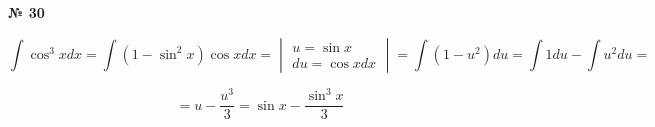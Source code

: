\documentclass{article}
\begin{document}
\textbf{№ 30} 

$$ \int \cos^3{x} dx
= \int (1-\sin^2{x})\cos{x}dx
= \begin{vmatrix} u = \sin{x} \\
                 du = \cos{x}dx \end{vmatrix} 
= \int (1-u^2)du
= \int 1du - \int u^2du
= $$

$$ = u - \frac{u^3}{3}
= \sin{x} - \frac{\sin^3{x}}{3}$$
\end{document}
